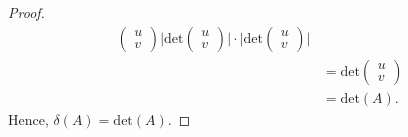 \begin{proof}
\begin{align*}
{\begin{pmatrix}
                                               u \\
                                               v
                                              \end{pmatrix}  }{ \Big| \text{det} \begin{pmatrix} 
                                                         u \\
                                                         v
                                                        \end{pmatrix}  \Big|  } \cdot  \Big| \text{det}\begin{pmatrix} 
                                                                   u \\
                                                                   v
                                                                  \end{pmatrix}  \Big| \\ 
                                    &= \text{det} \begin{pmatrix} 
                                               u \\
                                               v
                                              \end{pmatrix} \\
                                    &= \text{det}(A).
   \end{align*}
   Hence, \( \delta(A) = \text{det}(A) \).
\end{proof}
